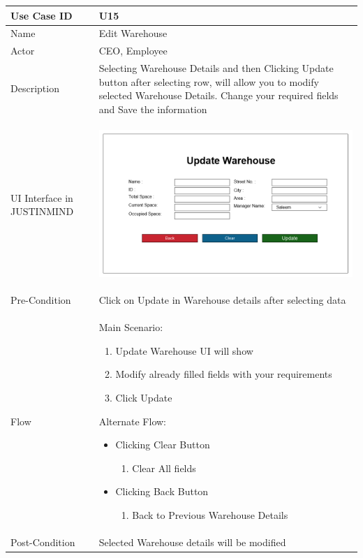 \documentclass[12pt,a4paper]{report}
\begin{document}
\begin{tabular}{ | m{3cm} | m{12cm}| } \hline

Use Case ID &  U15 \\\hline

Name  	    &  Edit Warehouse \\ \hline

Actor     	& CEO, Employee \\ \hline

Description &  Selecting Warehouse Details and then Clicking Update button after selecting row, will allow you to modify selected Warehouse Details. Change your required fields and Save the information \\ \hline

UI Interface in JUSTINMIND & \begin{center} \includegraphics[scale=0.3]{./UIs for Latex Reports/UI-015 EditWarehouse@1x.png}\end{center}  \\ \hline

Pre-Condition & Click on Update in Warehouse details after selecting data  \\ \hline


Flow & Main Scenario:

\begin{enumerate}
\item   Update Warehouse UI will show
\item   Modify already filled fields with your requirements
\item   Click Update


\end{enumerate}

Alternate Flow:

\begin{itemize}
\item Clicking Clear Button
	\begin{enumerate}
		\item Clear All fields
	\end{enumerate}
\item  Clicking Back Button
	\begin{enumerate}
	   	 \item	Back to Previous Warehouse Details
	\end{enumerate}
\end{itemize}
\\ \hline
Post-Condition &   Selected Warehouse details will be modified  \\ \hline


\end{tabular}
\end{document}
